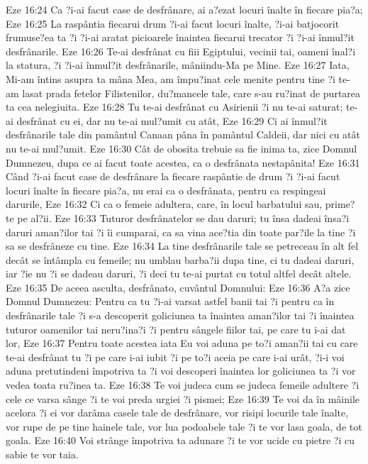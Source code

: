 Eze 16:24  Ca ?i-ai facut case de desfrânare, ai a?ezat locuri înalte în fiecare pia?a;
Eze 16:25  La raspântia fiecarui drum ?i-ai facut locuri înalte, ?i-ai batjocorit frumuse?ea ta ?i ?i-ai aratat picioarele înaintea fiecarui trecator ?i ?i-ai înmul?it desfrânarile.
Eze 16:26  Te-ai desfrânat cu fiii Egiptului, vecinii tai, oameni înal?i la statura, ?i ?i-ai înmul?it desfrânarile, mâniindu-Ma pe Mine.
Eze 16:27  Iata, Mi-am întins asupra ta mâna Mea, am împu?inat cele menite pentru tine ?i te-am lasat prada fetelor Filistenilor, du?mancele tale, care s-au ru?inat de purtarea ta cea nelegiuita.
Eze 16:28  Tu te-ai desfrânat cu Asirienii ?i nu te-ai saturat; te-ai desfrânat cu ei, dar nu te-ai mul?umit cu atât,
Eze 16:29  Ci ai înmul?it desfrânarile tale din pamântul Canaan pâna în pamântul Caldeii, dar nici cu atât nu te-ai mul?umit.
Eze 16:30  Cât de obosita trebuie sa fie inima ta, zice Domnul Dumnezeu, dupa ce ai facut toate acestea, ca o desfrânata nestapânita!
Eze 16:31  Când ?i-ai facut case de desfrânare la fiecare raspântie de drum ?i ?i-ai facut locuri înalte în fiecare pia?a, nu erai ca o desfrânata, pentru ca respingeai darurile,
Eze 16:32  Ci ca o femeie adultera, care, în locul barbatului sau, prime?te pe al?ii.
Eze 16:33  Tuturor desfrânatelor se dau daruri; tu însa dadeai însa?i daruri aman?ilor tai ?i îi cumparai, ca sa vina ace?tia din toate par?ile la tine ?i sa se desfrâneze cu tine.
Eze 16:34  La tine desfrânarile tale se petreceau în alt fel decât se întâmpla cu femeile; nu umblau barba?ii dupa tine, ci tu dadeai daruri, iar ?ie nu ?i se dadeau daruri, ?i deci tu te-ai purtat cu totul altfel decât altele.
Eze 16:35  De aceea asculta, desfrânato, cuvântul Domnului:
Eze 16:36  A?a zice Domnul Dumnezeu: Pentru ca tu ?i-ai varsat astfel banii tai ?i pentru ca în desfrânarile tale ?i s-a descoperit goliciunea ta înaintea aman?ilor tai ?i înaintea tuturor oamenilor tai neru?ina?i ?i pentru sângele fiilor tai, pe care tu i-ai dat lor,
Eze 16:37  Pentru toate acestea iata Eu voi aduna pe to?i aman?ii tai cu care te-ai desfrânat tu ?i pe care i-ai iubit ?i pe to?i aceia pe care i-ai urât, ?i-i voi aduna pretutindeni împotriva ta ?i voi descoperi înaintea lor goliciunea ta ?i vor vedea toata ru?inea ta.
Eze 16:38  Te voi judeca cum se judeca femeile adultere ?i cele ce varsa sânge ?i te voi preda urgiei ?i pismei;
Eze 16:39  Te voi da în mâinile acelora ?i ei vor darâma casele tale de desfrânare, vor risipi locurile tale înalte, vor rupe de pe tine hainele tale, vor lua podoabele tale ?i te vor lasa goala, de tot goala.
Eze 16:40  Voi strânge împotriva ta adunare ?i te vor ucide cu pietre ?i cu sabie te vor taia.
